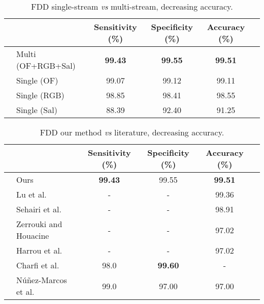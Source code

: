 \documentclass[conference]{IEEEtran}
\begin{document}
\begin{table*}[t]
\centering
\caption{FDD single-stream \textit{vs} multi-stream, decreasing accuracy.}
\label{tab:fdd-ensem}
\begin{tabular}{llcccl}
\hline
 &                      & Sensitivity (\%)  & Specificity (\%)  & Accuracy (\%)     &  \\ \hline
 & Multi (OF+RGB+Sal)   & \textbf{99.43}    & \textbf{99.55}    & \textbf{99.51}    &  \\
 & Single (OF)          & 99.07             & 99.12             & 99.11             &  \\
 & Single (RGB)         & 98.85             & 98.41             & 98.55             &  \\
 & Single (Sal)         & 88.39             & 92.40             & 91.25             & \\ \hline
\end{tabular}
\end{table*}

\begin{table*}[t]
\centering
\caption{FDD our method \textit{vs} literature, decreasing accuracy.}
\label{tab:fdd-our-their}
\begin{tabular}{llcccl}
\hline
 &                                                      & Sensitivity (\%)  & Specificity (\%)  & Accuracy (\%)     & \\ \hline
 & Ours                                                 & \textbf{99.43}    & 99.55             & \textbf{99.51}    & \\
 & Lu et al.~\cite{lu2018deep}                          & -                 & -                 & 99.36             & \\
 & Sehairi et al.~\cite{sehairi2018elderly}             & -                 & -                 & 98.91             & \\
 & Zerrouki and Houacine~\cite{zerrouki2018combined}    & -                 & -                 & 97.02             & \\
 & Harrou et al.~\cite{harrou2017vision}                & -                 & -                 & 97.02             & \\
 & Charfi et al.~\cite{charfi2012definition}            & 98.0              & \textbf{99.60}    & -                 & \\
 & N\'u\~nez-Marcos et al.~\cite{nunez2017vision}       & 99.0              & 97.00             & 97.00             & \\ \hline
\end{tabular}
\end{table*}
 
\end{document}
